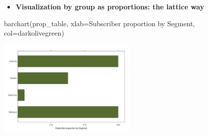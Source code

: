 \documentclass[
  ignorenonframetext,
]{beamer}
\newenvironment{Shaded}{\begin{snugshade}}{\end{snugshade}}
\newcommand{\AttributeTok}[1]{\textcolor[rgb]{0.40,0.45,0.13}{#1}}
\newcommand{\CommentTok}[1]{\textcolor[rgb]{0.37,0.37,0.37}{#1}}
\newcommand{\DecValTok}[1]{\textcolor[rgb]{0.68,0.00,0.00}{#1}}
\newcommand{\FunctionTok}[1]{\textcolor[rgb]{0.28,0.35,0.67}{#1}}
\newcommand{\NormalTok}[1]{\textcolor[rgb]{0.00,0.23,0.31}{#1}}
\newcommand{\OtherTok}[1]{\textcolor[rgb]{0.00,0.23,0.31}{#1}}
\newcommand{\SpecialCharTok}[1]{\textcolor[rgb]{0.37,0.37,0.37}{#1}}
\newcommand{\StringTok}[1]{\textcolor[rgb]{0.13,0.47,0.30}{#1}}
\providecommand{\tightlist}{%
  \setlength{\itemsep}{0pt}\setlength{\parskip}{0pt}}\usepackage{longtable,booktabs,array}
\begin{document}
\begin{frame}[fragile]{}
\label{section-15}
\begin{itemize}
\tightlist
\item
  \textbf{Visualization by group as proportions: the lattice way}
\end{itemize}

\tiny

\begin{Shaded}
\end{Shaded}

\begin{Shaded}
\begin{Highlighting}[]
\FunctionTok{barchart}\NormalTok{(prop\_table, }
         \AttributeTok{xlab=}\StringTok{\textquotesingle{}Subscriber proportion by Segment\textquotesingle{}}\NormalTok{, }\AttributeTok{col=}\StringTok{\textquotesingle{}darkolivegreen\textquotesingle{}}\NormalTok{)}
\end{Highlighting}
\end{Shaded}

\begin{center}
\includegraphics[width=0.5\textwidth,height=\textheight]{005_comparing_groups_tables_and_visualizations_files/figure-beamer/unnamed-chunk-14-1.pdf}
\end{center}
\end{frame}
\end{document}
